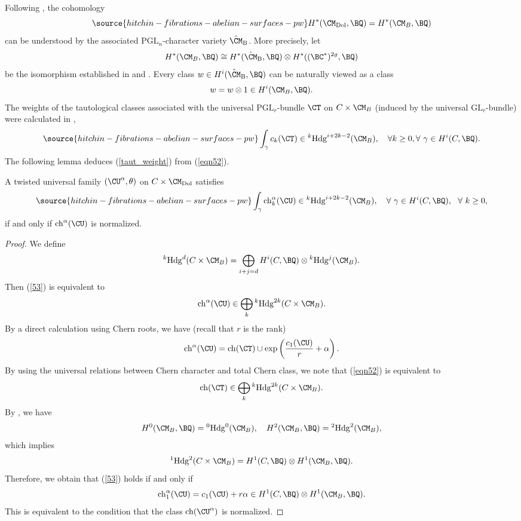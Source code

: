 Following \cite{HRV,HT1,Shende}, the cohomology
\begin{equation}\label{eqn89}
\source{hitchin-fibrations-abelian-surfaces-pw}
H^*(\CM_{\mathrm{Dol}}, \BQ) = H^*(\CM_B, \BQ)
\end{equation}
can be understood by the associated $\mathrm{PGL}_n$-character variety $\hat{\CM}_{\mathrm{B}}$. More precisely, let
\[
H^*(\CM_B, \BQ) \cong H^*(\hat{\CM}_{\mathrm{B}}, \BQ) \otimes H^*((\BC^*)^{2g}, \BQ)
\]
be the isomorphism established in \cite[Section 1]{HT1} and \cite[Theorem 2.2.12]{HRV}. Every class $w \in H^i(\hat{\CM}_{\mathrm{B}}, \BQ)$ can be naturally viewed as a class
\[
w = w\otimes 1 \in H^i(\CM_B, \BQ).
\]
The weights of the tautological classes associated with the universal $\mathrm{PGL}_r$-bundle $\CT$ on $C\times \CM_B$ (induced by the universal $\mathrm{GL}_r$-bundle) were calculated in \cite{Shende},
\begin{equation}\label{eqn52}
\source{hitchin-fibrations-abelian-surfaces-pw}
\int_\gamma c_k(\CT) \in {^k\mathrm{Hdg}^{i+2k-2}(\CM_B)},\quad { \forall k \geq 0}, \forall~\gamma \in H^i(C, \BQ).
\end{equation}
The following lemma deduces (\ref{taut_weight}) from (\ref{eqn52}).

\begin{lem}
\notready\label{lem3.1}
A twisted universal family $(\CU^\alpha, \theta)$ on $C \times {\CM}_{\mathrm{Dol}}$ satisfies
\begin{equation}\label{53}
\source{hitchin-fibrations-abelian-surfaces-pw}
\int_\gamma \mathrm{ch}^\alpha_k(\CU) \in {^k\mathrm{Hdg}^{i+2k-2}(\CM_B)},\quad \forall~\gamma \in H^i(C, \BQ),~~ \forall~ k\geq 0,
\end{equation}
if and only if $\mathrm{ch}^\alpha(\CU)$ is normalized.
\end{lem}

\begin{proof}
We define
\[
{^k\mathrm{Hdg}^{d}(C\times \CM_B)} = \bigoplus_{i+j=d} H^i(C, \BQ) \otimes {^k\mathrm{Hdg}^{j}(\CM_B)}.
\]
Then (\ref{53}) is equivalent to
\[
\mathrm{ch}^\alpha(\CU) \in \bigoplus_k {^k\mathrm{Hdg}^{2k}(C\times \CM_B)}.
\]
By a direct calculation using Chern roots, we have (recall that $r$ is the rank)
\[
\mathrm{ch}^\alpha(\CU) = \mathrm{ch}(\CT) \cup \mathrm{exp}\left(\frac{c_1(\CU)}{r}+ \alpha\right).
\]
By using the universal relations between Chern character and total Chern class, we note that (\ref{eqn52}) is equivalent to \[
\mathrm{ch}(\CT) \in \bigoplus_k {^k\mathrm{Hdg}^{2k}(C\times \CM_B)}.
\]
By \cite{Shende}, we have
\[
H^0(\CM_B, \BQ) = {^0\mathrm{Hdg}^{0}(\CM_B)}, \quad H^2(\CM_B, \BQ) = {^2\mathrm{Hdg}^{2}(\CM_B)},
\]
which implies
\[
{^1\mathrm{Hdg}^{2}(C\times \CM_B)} = H^1(C, \BQ)\otimes H^1(\CM_B ,\BQ).
\]
Therefore, we obtain that (\ref{53}) holds if and only if
\[
\mathrm{ch}_1^\alpha(\CU)= c_1(\CU) + r\alpha \in H^1(C, \BQ) \otimes H^1(\CM_B, \BQ).
\]
This is equivalent to the condition that the class $\mathrm{ch}(\CU^\alpha)$ is normalized.
\end{proof}

